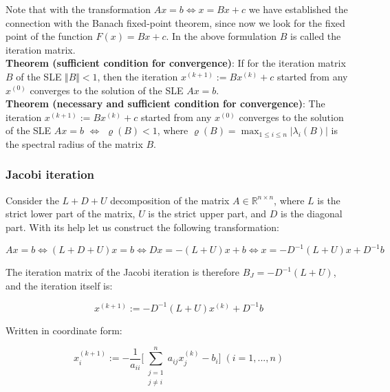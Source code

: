\documentclass[margin=0px]{article}
\begin{document}
Note that with the transformation $Ax = b \Longleftrightarrow x = Bx + c$ we have established the connection with the
Banach fixed-point theorem, since now we look for the fixed point of the function $F(x) = Bx + c$. In the above formulation
$B$ is called the iteration matrix.\\

\noindent \textbf{Theorem (sufficient condition for convergence)}: If for the iteration matrix $B$ of the SLE $\Vert B \Vert < 1$,
then the iteration $x^{(k+1)} := Bx^{(k)} + c$ started from any $x^{(0)}$ converges to the solution of the SLE $Ax = b$.\\

\noindent \textbf{Theorem (necessary and sufficient condition for convergence)}: The iteration
$x^{(k+1)} := Bx^{(k)} + c$ started from any $x^{(0)}$ converges to the solution of the SLE $Ax = b$ $\Longleftrightarrow$
$\varrho(B) < 1$, where $\varrho(B) = \max_{1 \leq i \leq n} |\lambda_{i}(B)|$ is the spectral radius of the matrix $B$.

\subsubsection{Jacobi iteration}

Consider the $L + D + U$ decomposition of the matrix $A \in \mathbb{R}^{n \times n}$, where $L$ is the strict lower part of the matrix, $U$ is the
strict upper part, and $D$ is the diagonal part. With its help let us construct the following transformation:

\begin{displaymath}
    Ax = b \Longleftrightarrow (L + D + U)x = b \Longleftrightarrow Dx = -(L+U)x+b \Longleftrightarrow
    x = -D^{-1}(L+U)x + D^{-1}b
\end{displaymath}

\noindent The iteration matrix of the Jacobi iteration is therefore $B_{J} = -D^{-1}(L + U)$, and the iteration itself is:

\begin{displaymath}
    x^{(k+1)} :=  -D^{-1}(L + U)x^{(k)} + D^{-1}b
\end{displaymath}

\noindent Written in coordinate form:

\begin{displaymath}
    x^{(k+1)}_{i} :=
    -\frac{1}{a_{ii}}
    \Bigg[
    \sum_{\substack{j=1\\ j \not = i}}^{n} a_{ij}x_{j}^{(k)} - b_{i}
    \Bigg]
    \; (i = 1, ..., n)
\end{displaymath}
\end{document}
